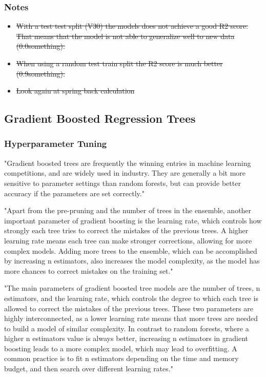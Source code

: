 \subsubsection*{Notes}
\begin{itemize}
    \item \sout{With a test test split (V30) the models does not achieve a good R2 score. That means that the model is not able to generalize well to new data (0.0something).}
    \item \sout{When using a random test train split the R2 score is much better (0.9something).}
    \item  \sout{Look again at spring back calculation}
\end{itemize}



\subsection{Gradient Boosted Regression Trees}

\subsubsection*{Hyperparameter Tuning}

"Gradient boosted trees are frequently the winning entries in machine
learning competitions, and are widely used in industry. They are
generally a bit more sensitive to parameter settings than random
forests, but can provide better accuracy if the parameters are set
correctly." \cite[p. 88-89]{muller_introductionmachinelearning_2016}

"Apart from the pre-pruning and the number of trees in the ensemble,
another important parameter of gradient boosting is the learning rate,
which controls how strongly each tree tries to correct the mistakes of
the previous trees. A higher learning rate means each tree can make
stronger corrections, allowing for more complex models. Adding more trees to the ensemble, which can be accomplished by increasing
n estimators, also increases the model complexity, as the model has
more chances to correct mistakes on the training set." \cite[p. 88-89]{muller_introductionmachinelearning_2016}

"The main parameters of gradient boosted tree models are the number
of trees, n estimators, and the learning rate, which controls the degree to which each tree is allowed to correct the mistakes of the previous trees.
These two parameters are highly interconnected, as a lower
learning rate means that more trees are needed to build a model of
similar complexity. In contrast to random forests, where a higher
n estimators value is always better, increasing n estimators in gradient
boosting leads to a more complex model, which may lead to overfitting. A
common practice is to fit n estimators depending on the time and
memory budget, and then search over different learning rates." \cite[p. 88-89]{muller_introductionmachinelearning_2016}

